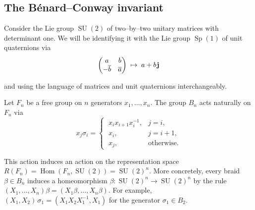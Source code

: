 \documentclass[11pt,reqno]{amsart}
\theoremstyle{definition}
\renewcommand{\j}{\mspace{1.5mu}\mathbf j}
\newcommand{\Hom}{\operatorname{Hom}}
\newcommand{\SU}{\operatorname{SU}}
\newcommand{\Sp}{\operatorname{Sp}}
\begin{document}
\begin{sloppypar}

\subsection{The B{\'e}nard--Conway invariant}\label{sec:invariant-def}
Consider the Lie group $\SU(2)$ of two--by--two unitary matrices with determinant one. We will be identifying it with the Lie group $\Sp(1)$ of unit quaternions via
\begin{equation}\label{E:sp1}
\begin{pmatrix}
a & b \\
- \overline{b} & \overline{a}
\end{pmatrix} \; \mapsto \; a + b \j
\end{equation}

\smallskip\noindent
and using the language of matrices and unit quaternions interchangeably. 

Let $F_n$ be a free group on $n$ generators $x_1,\ldots, x_n$. The group $B_n$ acts naturally on $F_n$ via 
\begin{equation}
			\label{eq:group-action}
			x_j \sigma_i = \begin{cases}
				\; x_i x_{i + 1} x_i^{- 1}, & j = i, \\
				\; x_i, & j = i + 1, \\
				\; x_j, & \text{otherwise.}
			\end{cases}
		\end{equation}

\smallskip\noindent
This action induces an action on the representation space $R(F_n) = \Hom(F_n, \SU(2)) = \SU(2)^n$. More concretely, every braid $\beta \in B_n$ induces a homeomorphism $\beta: \SU(2)^n \to \SU(2)^n$ by the rule $(X_1,\ldots, X_n)\beta = (X_1\beta,\ldots, X_n\beta)$. For example, $(X_1, X_2)\,\sigma_1 = (X_1 X_2 X_1^{-1}, X_1)$ for the generator $\sigma_1 \in B_2$.


\end{sloppypar}
\end{document}
